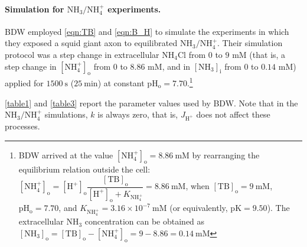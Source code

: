 \documentclass[fleqn,10pt]{physiome}
\begin{document}
\paragraph{Simulation for $\mathrm{NH_3}/\mathrm{NH_4^+}$ experiments.}

BDW employed \autoref{eqn:TB} and \autoref{eqn:B_H} to simulate the experiments in which they exposed a squid giant axon to equilibrated $\mathrm{NH_3}/\mathrm{NH_4^+}$. Their simulation protocol was a step change in extracellular $\mathrm{NH_4Cl}$ from $0$ to $9$ $\mathrm{mM}$ (that is, a step change in $\mathrm{[NH_4^+]_o}$ from $0$ to $8.86$ $\mathrm{mM}$, and in $\mathrm{[NH_3]_i}$ from $0$ to $0.14$ $\mathrm{mM}$) applied for $1500~\mathrm{s}$ ($25~\mathrm{min}$) at constant $\mathrm{pH_o}=7.70$.\footnote{BDW arrived at the value $\mathrm{[NH_4^+]_o}= 8.86~\mathrm{mM}$ by rearranging the equilibrium relation outside the cell: $\mathrm{[NH_4^+]_o}=\mathrm{[H^+]_o}\dfrac{\mathrm{[TB]_o}}{\mathrm{[H^+]_o}+K_\mathrm{NH_4^+}}= 8.86~\mathrm{mM}$, when $\mathrm{[TB]_o}= 9~\mathrm{mM}$, $\mathrm{pH_o}= 7.70$, and $K_\mathrm{NH_4^+} = 3.16\times 10^{-7}~\mathrm{mM}$ (or equivalently, $\mathrm{pK} = 9.50$). The extracellular $\mathrm{NH_3}$ concentration can be obtained as $\mathrm{[NH_3]_o}=\mathrm{[TB]_o}-\mathrm{[NH_4^+]_o}= 9-8.86 = 0.14~\mathrm{mM}$}

\autoref{table1} and \autoref{table3} report the parameter values used by BDW. Note that in the $\mathrm{NH_3}/\mathrm{NH_4^+}$ simulations, $k$ is always zero, that is, $J_\mathrm{H^+}$ does not affect these processes.
\end{document}
